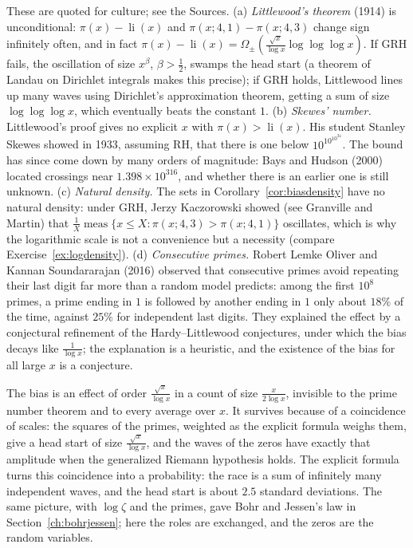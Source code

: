 \begin{remark}
These are quoted for culture; see the Sources. (a) \emph{Littlewood's theorem} (1914) is unconditional: $\pi(x)-\operatorname{li}(x)$ and $\pi(x;4,1)-\pi(x;4,3)$ change sign infinitely often, and in fact $\pi(x)-\operatorname{li}(x)=\Omega_\pm(\frac{\sqrt x}{\log x}\log\log\log x)$. If GRH fails, the oscillation of size $x^{\beta}$, $\beta>\frac12$, swamps the head start (a theorem of Landau on Dirichlet integrals makes this precise); if GRH holds, Littlewood lines up many waves using Dirichlet's approximation theorem, getting a sum of size $\log\log\log x$, which eventually beats the constant $1$. (b) \emph{Skewes' number.} Littlewood's proof gives no explicit $x$ with $\pi(x)>\operatorname{li}(x)$. His student Stanley Skewes showed in 1933, assuming RH, that there is one below $10^{10^{10^{34}}}$. The bound has since come down by many orders of magnitude: Bays and Hudson (2000) located crossings near $1.398\times10^{316}$, and whether there is an earlier one is still unknown. (c) \emph{Natural density.} The sets in Corollary~\ref{cor:biasdensity} have no natural density: under GRH, Jerzy Kaczorowski showed (see Granville and Martin) that $\frac1X\operatorname{meas}\{x\le X:\pi(x;4,3)>\pi(x;4,1)\}$ oscillates, which is why the logarithmic scale is not a convenience but a necessity (compare Exercise~\ref{ex:logdensity}). (d) \emph{Consecutive primes.} Robert Lemke Oliver and Kannan Soundararajan (2016) observed that consecutive primes avoid repeating their last digit far more than a random model predicts: among the first $10^8$ primes, a prime ending in $1$ is followed by another ending in $1$ only about $18\%$ of the time, against $25\%$ for independent last digits. They explained the effect by a conjectural refinement of the Hardy--Littlewood conjectures, under which the bias decays like $\frac1{\log x}$; the explanation is a heuristic, and the existence of the bias for all large $x$ is a conjecture.
\end{remark}

\begin{beauty}
The bias is an effect of order $\frac{\sqrt x}{\log x}$ in a count of size $\frac x{2\log x}$, invisible to the prime number theorem and to every average over $x$. It survives because of a coincidence of scales: the squares of the primes, weighted as the explicit formula weighs them, give a head start of size $\frac{\sqrt x}{\log x}$, and the waves of the zeros have exactly that amplitude when the generalized Riemann hypothesis holds. The explicit formula turns this coincidence into a probability: the race is a sum of infinitely many independent waves, and the head start is about $2.5$ standard deviations. The same picture, with $\log\zeta$ and the primes, gave Bohr and Jessen's law in Section~\ref{ch:bohrjessen}; here the roles are exchanged, and the zeros are the random variables.
\end{beauty}

